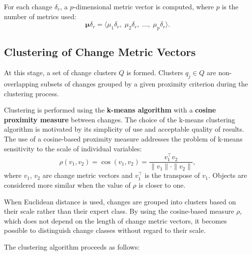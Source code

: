 \documentclass[11pt,a4paper]{article}
\begin{document}
For each change $\delta_r$, a $p$-dimensional metric vector is computed, where $p$ is the number of metrics used:
\begin{equation}
    \boldsymbol{\mu}\delta_r = \langle \mu_1\delta_r,\; \mu_2\delta_r,\; \ldots,\; \mu_p\delta_r \rangle.
\end{equation}

\subsection{Clustering of Change Metric Vectors}
\label{sec:clustering}

At this stage, a set of change clusters $Q$ is formed. Clusters $q_j \in Q$ are non-overlapping subsets of changes grouped by a given proximity criterion during the clustering process.

Clustering is performed using the \textbf{k-means algorithm} with a \textbf{cosine proximity measure} between changes. The choice of the k-means clustering algorithm is motivated by its simplicity of use and acceptable quality of results. The use of a cosine-based proximity measure addresses the problem of k-means sensitivity to the scale of individual variables:
\begin{equation}
    \rho(v_1, v_2) = \cos(v_1, v_2) = \frac{v_1^{\top} v_2}{\|v_1\| \cdot \|v_2\|},
    \label{eq:cosine}
\end{equation}
where $v_1$, $v_2$ are change metric vectors and $v_1^{\top}$ is the transpose of $v_1$. Objects are considered more similar when the value of $\rho$ is closer to one.

When Euclidean distance is used, changes are grouped into clusters based on their scale rather than their expert class. By using the cosine-based measure $\rho$, which does not depend on the length of change metric vectors, it becomes possible to distinguish change classes without regard to their scale.

The clustering algorithm proceeds as follows:
\end{document}
